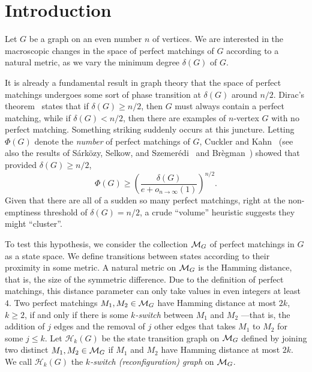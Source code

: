 \documentclass[11pt,a4paper]{article}
\theoremstyle{definition}
\begin{document}


\section{Introduction}

Let $G$ be a graph on an even number $n$ of vertices.  We are interested in the
macroscopic changes in the space of perfect matchings of $G$
according to a natural metric, as we vary the minimum degree $\delta(G)$ of
$G$.

It is already a fundamental result in graph theory that the space of perfect
matchings undergoes some sort of phase transition at $\delta(G)$ around $n/2$.
Dirac's theorem~\cite{Dir52} states that if $\delta(G) \ge n/2$, then $G$ must
always contain a perfect matching, while if $\delta(G) < n/2$, then there are examples
of $n$-vertex $G$ with no perfect matching.  Something striking suddenly occurs at this juncture. Letting $\Phi(G)$ denote the {\em number} of perfect matchings of
$G$, Cuckler and Kahn~\cite{CuKa09a,CuKa09b} (see also the
results of Sárközy, Selkow, and Szemerédi~\cite{SSS03} and
Br\`egman~\cite{Bre73}) showed that provided $\delta(G) \ge n/2$,
\begin{equation}\label{eqn:delta} \Phi(G) \ge
\left(\frac{\delta(G)}{e+o_{n\to\infty}(1)}\right)^{n/2}.
\end{equation}
Given that there are all of a sudden so many perfect matchings, right at the non-emptiness
threshold of $\delta(G) = n/2$, a  crude ``volume'' heuristic suggests they might ``cluster''.

To test this hypothesis, we consider the collection ${\cal M}_G$ of
perfect matchings in $G$ as a state space. We define transitions between states
according to their proximity in some metric. A natural metric on ${\cal M}_G$ is
the Hamming distance, that is, the size of the symmetric difference. Due to the
definition of perfect matchings, this distance parameter can only take values in
even integers at least $4$. Two perfect matchings $M_1, M_2 \in {\cal M}_G$ have
Hamming distance at most $2k$, $k\ge 2$, if and only if there is some {\em
  $k$-switch} between $M_1$ and $M_2$ ---that is, the addition of $j$ edges and
the removal of $j$ other edges that takes $M_1$ to $M_2$ for some $j \le k$. Let
$\mathcal H_k(G)$ be the state transition graph  on %
${\cal M}_G$ defined by joining two distinct $M_1,M_2 \in {\cal M}_G$ if $M_1$
and $M_2$ have Hamming distance at most $2k$. We call $\mathcal H_k(G)$ the {\em
  $k$-switch (reconfiguration) graph} on ${\cal M}_G$.
\end{document}
